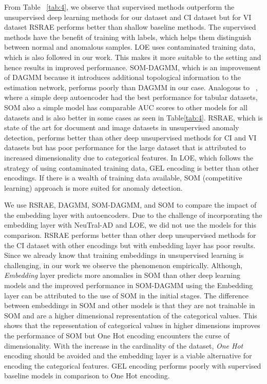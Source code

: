 \documentclass{article}
\begin{document}
From Table ~\ref{tab:4}, we observe that supervised methods outperform the unsupervised deep learning methods for our dataset and CI dataset but for VI dataset RSRAE performs better than shallow baseline methods. The supervised methods have the benefit of training with labels, which helps them distinguish between normal and anomalous samples. LOE uses contaminated training data, which is also followed in our work. This makes it more suitable to the setting and hence results in improved performance. SOM-DAGMM, which is an improvement of DAGMM because it introduces additional topological information to the estimation network, performs poorly than DAGMM in our case. Analogous to ~\citep{recent2022}, where a simple deep autoencoder had the best performance for tabular datasets, SOM also a simple model has comparable AUC scores to other models for all datasets and is also better in some cases as seen in Table\ref{tab:4}. RSRAE, which is state of the art for document and image datasets in unsupervised anomaly detection, performs better than other deep unsupervised methods for CI and VI datasets but has poor performance for the large dataset that is attributed to increased dimensionality due to categorical features. In LOE, which follows the strategy of using contaminated training data, GEL encoding is better than other encodings. If there is a wealth of training data available, SOM (competitive learning) approach is more suited for anomaly detection.

We use RSRAE, DAGMM, SOM-DAGMM, and SOM to compare the impact of the embedding layer with autoencoders. Due to the challenge of incorporating the embedding layer with NeuTral-AD and LOE, we did not use the models for this comparison. RSRAE performs better than other deep unsupervised methods for the CI dataset with other encodings but with embedding layer has poor results. Since we already know that training embeddings in unsupervised learning is challenging, in our work we observe the phenomenon empirically. Although, \textit{Embedding} layer predicts more anomalies in SOM than other deep learning models and the improved performance in SOM-DAGMM using the Embedding layer can be attributed to the use of SOM in the initial stages. The difference between embeddings in SOM and other models is that they are not trainable in SOM and are a higher dimensional representation of the categorical values. This shows that the representation of categorical values in higher dimensions improves the performance of SOM but One Hot encoding encounters the curse of dimensionality. With the increase in the cardinality of the dataset, \textit{One Hot} encoding should be avoided and the embedding layer is a viable alternative for encoding the categorical features. GEL encoding performs poorly with supervised baseline models in comparison to One Hot encoding. 
\end{document}
